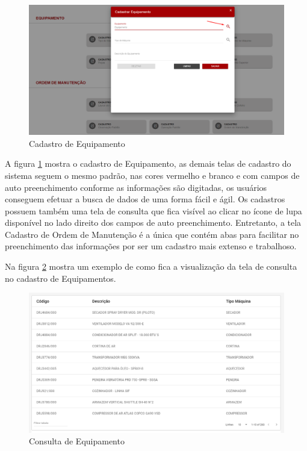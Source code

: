 \begin{figure}[H]
	\caption{\label{web-cadastro-equipamento}Cadastro de Equipamento}
	\begin{center}
		\includegraphics[scale=0.40]{./Figuras/agil.it/web-cadastro-equipamento.png}
	\end{center}
\end{figure}

A figura \ref{web-cadastro-equipamento} mostra o cadastro de Equipamento, as demais telas de cadastro do sistema seguem o mesmo padrão, nas cores vermelho e branco e com campos de auto preenchimento conforme as informações são digitadas, os usuários conseguem efetuar a busca de dados de uma forma fácil e ágil. Os cadastros possuem também uma tela de consulta que fica visível ao clicar no ícone de lupa disponível no lado direito dos campos de auto preenchimento.
Entretanto, a tela Cadastro de Ordem de Manutenção é a única que contém abas para facilitar no preenchimento das informações por ser um cadastro mais extenso e trabalhoso.

Na figura \ref{web-search-table} mostra um exemplo de como fica a visualização da tela de consulta no cadastro de Equipamentos.

\begin{figure}[H]
	\caption{\label{web-search-table}Consulta de Equipamento}
	\begin{center}
		\includegraphics[scale=0.50]{./Figuras/agil.it/web-search-table.png}
	\end{center}
\end{figure}

